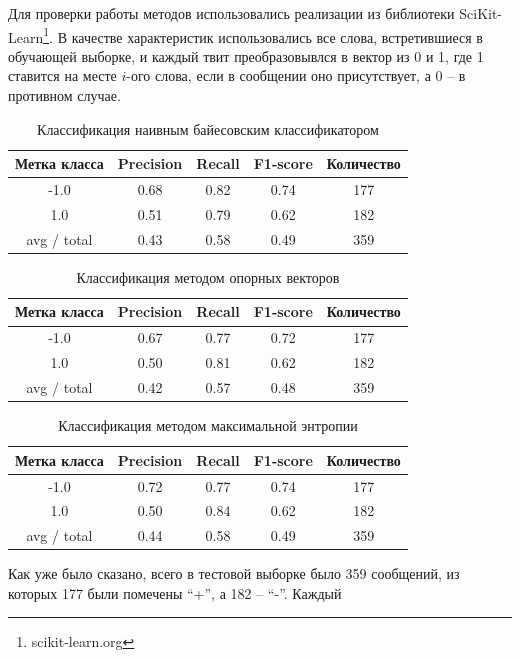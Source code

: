 Для проверки работы методов использовались реализации из библиотеки SciKit-Learn\footnote{scikit-learn.org}.
В качестве характеристик использовались все слова, встретившиеся в обучающей выборке,
и каждый твит преобразовывлся в вектор из 0 и 1, где 1 ставится
на месте $i$-ого слова, если в сообщении оно присутствует, а 0 -- в противном случае.

\begin{table}[h]
  \begin{minipage}{\textwidth}
    \centering
    \begin{tabular}{|c|c|c|c|c|}
      \hline
      \textbf{Метка класса} & \textbf{Precision} & \textbf{Recall} & \textbf{F1-score} &
      \textbf{Количество} \\ \hline
      -1.0&0.68&0.82&0.74&177\\ \hline
      1.0&0.51&0.79&0.62&182\\ \hline \hline
      avg / total&0.43&0.58&0.49&359\\
      \hline
    \end{tabular}
    \caption{Классификация наивным байесовским классификатором}\label{tab:nb}
  \end{minipage}
\end{table}

\begin{table}[h]
  \begin{minipage}{\textwidth}
    \centering
    \begin{tabular}{|c|c|c|c|c|}
      \hline
      \textbf{Метка класса} & \textbf{Precision} & \textbf{Recall} & \textbf{F1-score} &
      \textbf{Количество} \\ \hline
      -1.0&0.67&0.77&0.72&177\\ \hline
      1.0&0.50&0.81&0.62&182\\ \hline \hline
      avg / total&0.42&0.57&0.48&359\\
      \hline
    \end{tabular}
    \caption{Классификация методом опорных векторов}\label{tab:svm}
  \end{minipage}
\end{table}


\begin{table}
  \begin{minipage}{\textwidth}
    \begin{tabular}{|c|c|c|c|c|}
      \hline
      \textbf{Метка класса} & \textbf{Precision} & \textbf{Recall} & \textbf{F1-score} & \textbf{Количество} \\ \hline
      -1.0&0.72&0.77&0.74&177\\ \hline
      1.0&0.50&0.84&0.62&182\\ \hline \hline
      avg / total&0.44&0.58&0.49&359\\
      \hline
    \end{tabular}
    \caption{Классификация методом максимальной энтропии}\label{tab:maxent}
  \end{minipage}
\end{table}

Как уже было сказано, всего в тестовой выборке было 359 сообщений, из которых 177 были помечены ``+'', а 182 -- ``-''. Каждый